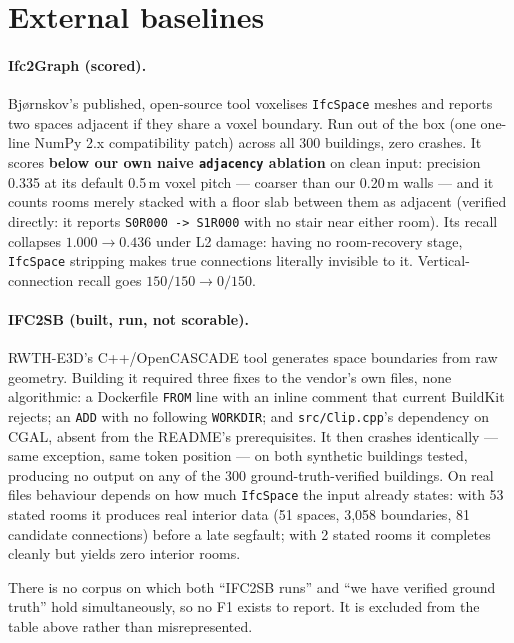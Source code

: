 \documentclass[11pt,a4paper]{article}
\begin{document}
\section{External baselines}

\paragraph{Ifc2Graph (scored).} Bj{\o}rnskov's published, open-source tool
voxelises \texttt{IfcSpace} meshes and reports two spaces adjacent if they share
a voxel boundary. Run out of the box (one one-line NumPy 2.x compatibility
patch) across all 300 buildings, zero crashes. It scores \textbf{below our own
naive \texttt{adjacency} ablation} on clean input: precision 0.335 at its
default 0.5\,m voxel pitch --- coarser than our 0.20\,m walls --- and it counts
rooms merely stacked with a floor slab between them as adjacent (verified
directly: it reports \texttt{S0R000 -> S1R000} with no stair near either room).
Its recall collapses $1.000\!\to\!0.436$ under L2 damage: having no
room-recovery stage, \texttt{IfcSpace} stripping makes true connections
literally invisible to it. Vertical-connection recall goes $150/150 \to 0/150$.

\paragraph{IFC2SB (built, run, not scorable).} RWTH-E3D's C++/OpenCASCADE tool
generates space boundaries from raw geometry. Building it required three fixes
to the vendor's own files, none algorithmic: a Dockerfile \texttt{FROM} line
with an inline comment that current BuildKit rejects; an \texttt{ADD} with no
following \texttt{WORKDIR}; and \texttt{src/Clip.cpp}'s dependency on CGAL,
absent from the README's prerequisites. It then crashes identically --- same
exception, same token position --- on both synthetic buildings tested,
producing no output on any of the 300 ground-truth-verified buildings. On real
files behaviour depends on how much \texttt{IfcSpace} the input already states:
with 53 stated rooms it produces real interior data (51 spaces, 3{,}058
boundaries, 81 candidate connections) before a late segfault; with 2 stated
rooms it completes cleanly but yields zero interior rooms.

There is no corpus on which both ``IFC2SB runs'' and ``we have verified ground
truth'' hold simultaneously, so no F1 exists to report. It is excluded from the
table above rather than misrepresented.
\end{document}
